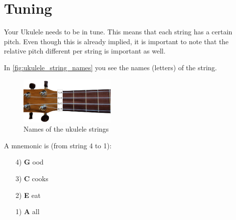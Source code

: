 \section{Tuning}

Your Ukulele needs to be in tune. This means that each string has a certain pitch. Even though this is already implied, it is important to note that the relative pitch different per string is important as well.

In \autoref{fig:ukulele_string_names} you see the names (letters) of the string.

\begin{figure}[h]
    \centering
    \includegraphics[width=0.42\textwidth]{../../Images/UkuleleNeck-StringNames.png}
    \caption{Names of the ukulele strings}
    \label{fig:ukulele_string_names}
\end{figure}

A mnemonic is (from string 4 to 1):

\begin{itemize}
	\setlength\itemsep{0em}
	\item[4)] \textbf{G} ood
	\item[3)] \textbf{C} cooks
	\item[2)] \textbf{E} eat
	\item[1)] \textbf{A} all 
\end{itemize}


